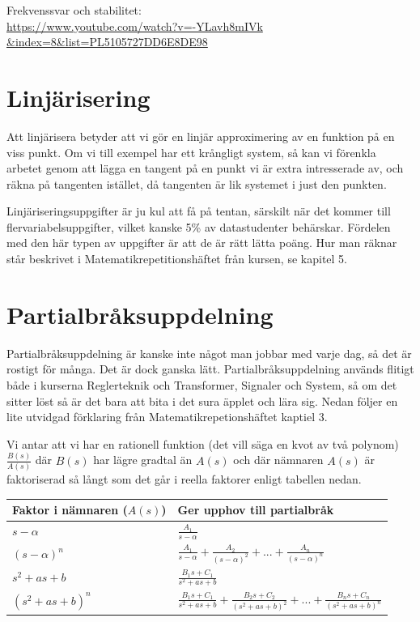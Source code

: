 \documentclass[a4paper]{article}
\begin{document}
Frekvenssvar och stabilitet:\\
\href{https://www.youtube.com/watch?v=-YLavh8mIVk&index=8&list=PL5105727DD6E8DE98}{https://www.youtube.com/watch?v=-YLavh8mIVk\\\&index=8\&list=PL5105727DD6E8DE98}


\section{Linjärisering}
\label{sec:linjärisering}
Att linjärisera betyder att vi gör en linjär approximering av en funktion på en viss punkt. Om vi till exempel har ett krångligt system, så kan vi förenkla arbetet genom att lägga en tangent på en punkt vi är extra intresserade av, och räkna på tangenten istället, då tangenten är lik systemet i just den punkten.

Linjäriseringsuppgifter är ju kul att få på tentan, särskilt när det kommer till flervariabelsuppgifter, vilket kanske 5\% av datastudenter behärskar. Fördelen med den här typen av uppgifter är att de är rätt lätta poäng. Hur man räknar står beskrivet i Matematikrepetitionshäftet från kursen, se kapitel 5.


\section{Partialbråksuppdelning}
\label{sec:partialbråksuppdelning}
Partialbråksuppdelning är kanske inte något man jobbar med varje dag, så det är rostigt för många. Det är dock ganska lätt. Partialbråksuppdelning används flitigt både i kurserna Reglerteknik och Transformer, Signaler och System, så om det sitter löst så är det bara att bita i det sura äpplet och lära sig. Nedan följer en lite utvidgad förklaring från Matematikrepetionshäftet kaptiel 3.

Vi antar att vi har en rationell funktion (det vill säga en kvot av två polynom) $\frac{B(s)}{A(s)}$ där $B(s)$ har lägre gradtal än $A(s)$ och där nämnaren $A(s)$ är faktoriserad så långt som det går i reella faktorer enligt tabellen nedan.\\

\begin{tabular}{l | l}
  Faktor i nämnaren ($A(s)$) & Ger upphov till partialbråk \\
  \hline
  $s - \alpha$       & $\frac{A_1}{s - \alpha}$ \\
  $(s - \alpha)^n$   & $\frac{A_1}{s - \alpha} + \frac{A_2}{(s - \alpha)^2} + ... + \frac{A_n}{(s - \alpha)^n}$ \\
  $s^2 + as + b$     & $\frac{B_1s + C_1}{s^2 + as + b}$ \\
  $(s^2 + as + b)^n$ & $\frac{B_1s + C_1}{s^2 + as + b} + \frac{B_2s + C_2}{(s^2 + as + b)^2} + ... + \frac{B_ns + C_n}{(s^2 + as + b)^n}$
\end{tabular}\\\\
\end{document}
